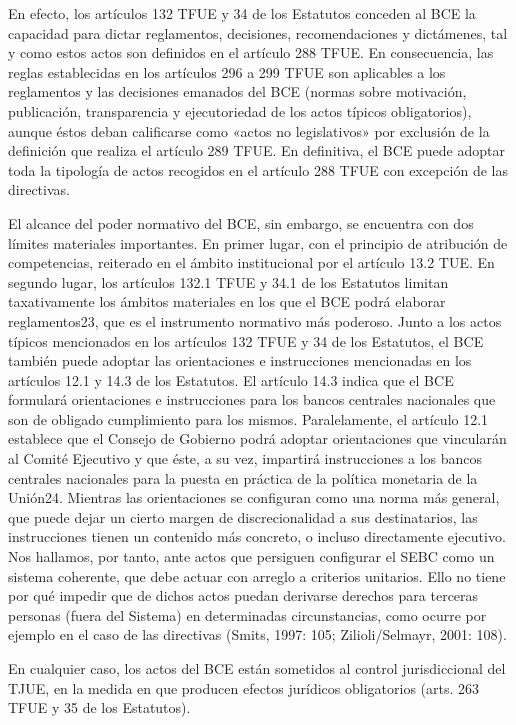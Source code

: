 \documentclass[10pt,a4paper]{article}
\begin{document}
En efecto, los artículos 132 TFUE y 34 de los Estatutos conceden al BCE la capacidad para dictar reglamentos, decisiones, recomendaciones y dictámenes, tal y como estos actos son definidos en el artículo 288 TFUE. En consecuencia, las reglas establecidas en los artículos 296 a 299 TFUE son aplicables a los reglamentos y las decisiones emanados del BCE (normas sobre motivación, publicación, transparencia y ejecutoriedad de los actos típicos obligatorios), aunque éstos deban calificarse como «actos no legislativos» por exclusión de la definición que realiza el artículo 289 TFUE. En definitiva, el BCE puede adoptar toda la tipología de actos recogidos en el artículo 288 TFUE con excepción de las directivas.

El alcance del poder normativo del BCE, sin embargo, se encuentra con dos límites materiales importantes. En primer lugar, con el principio de atribución de competencias, reiterado en el ámbito institucional por el artículo 13.2 TUE. En segundo lugar, los artículos 132.1 TFUE y 34.1 de los Estatutos limitan taxativamente los ámbitos materiales en los que el BCE podrá elaborar reglamentos23, que es el instrumento normativo más poderoso. Junto a los actos típicos mencionados en los artículos 132 TFUE y 34 de los Estatutos, el BCE también puede adoptar las orientaciones e instrucciones mencionadas en los artículos 12.1 y 14.3 de los Estatutos. El artículo 14.3 indica que el BCE formulará orientaciones e instrucciones para los bancos centrales nacionales que son de obligado cumplimiento para los mismos. Paralelamente, el artículo 12.1 establece que el Consejo de Gobierno podrá adoptar orientaciones que vincularán al Comité Ejecutivo y que éste, a su vez, impartirá instrucciones a los bancos centrales nacionales para la puesta en práctica de la política monetaria de la Unión24. Mientras las orientaciones se configuran como una norma más general, que puede dejar un cierto margen de discrecionalidad a sus destinatarios, las instrucciones tienen un contenido más concreto, o incluso directamente ejecutivo. Nos hallamos, por tanto, ante actos que persiguen configurar el SEBC como un sistema coherente, que debe actuar con arreglo a criterios unitarios. Ello no tiene por qué impedir que de dichos actos puedan derivarse derechos para terceras personas (fuera del Sistema) en determinadas circunstancias, como ocurre por ejemplo en el caso de las directivas (Smits, 1997: 105; Zilioli/Selmayr, 2001: 108).

En cualquier caso, los actos del BCE están sometidos al control jurisdiccional del TJUE, en la medida en que producen efectos jurídicos obligatorios (arts. 263 TFUE y 35 de los Estatutos).
\end{document}
